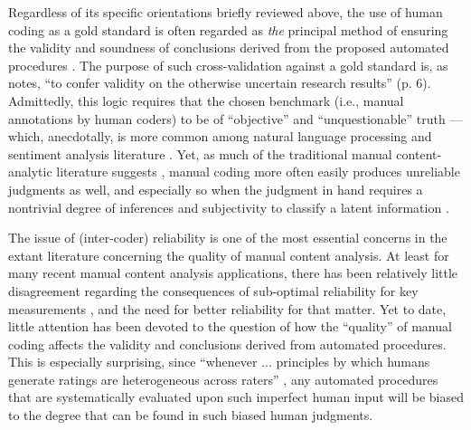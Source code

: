 \documentclass[man, floatsintext, 12pt, a4paper, noextraspace]{apa6}
\begin{document}
    Regardless of its specific orientations briefly reviewed above, the use of human coding as a gold standard is often regarded as \textit{the} principal method of ensuring the validity and soundness of conclusions derived from the proposed automated procedures \parencites[e.g., ][]{grimmer2013text, dimaggio2015adapting}. The purpose of such cross-validation against a gold standard is, as \textcite{Krippendorff2008validity} notes, \enquote{to confer validity on the otherwise uncertain research results} (p. 6). Admittedly, this logic requires that the chosen benchmark (i.e., manual annotations by human coders) to be of \enquote{objective} and \enquote{unquestionable} truth --- which, anecdotally, is more common among natural language processing and sentiment analysis literature \parencites[][]{dimaggio2015adapting}. Yet, as much of the traditional manual content-analytic literature suggests \parencites[e.g.,][]{krippendorff2004reliability, hayes2007answering, lombard2002content, ennser2018impact}, manual coding more often easily produces unreliable judgments as well, and especially so when the judgment in hand requires a nontrivial degree of inferences and subjectivity to classify a latent information \parencites[][]{riff2014analyzing, Krippendorff2013}.       
    
    The issue of (inter-coder) reliability is one of the most essential concerns in the extant literature concerning the quality of manual content analysis. At least for many recent manual content analysis applications, there has been relatively little disagreement regarding the consequences of sub-optimal reliability for key measurements \parencites[][]{krippendorff2004reliability, Krippendorff2013}, and the need for better reliability for that matter. Yet to date, little attention has been devoted to the question of how the \enquote{quality} of manual coding affects the validity and conclusions derived from automated procedures. This is especially surprising, since \enquote{whenever ... principles by which humans generate ratings are heterogeneous across raters} \parencites[][p. 4]{dimaggio2015adapting}, any automated procedures that are systematically evaluated upon such imperfect human input will be biased to the degree that can be found in such biased human judgments. 
    
\end{document}
